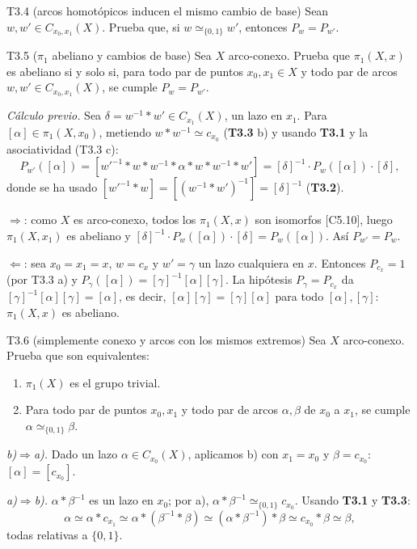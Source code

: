 \begin{ejercicio}{T3.4 (arcos homotópicos inducen el mismo cambio de base)}
Sean $w, w' \in C_{x_0,x_1}(X)$. Prueba que, si $w \simeq_{\{0,1\}} w'$, entonces $P_w = P_{w'}$.

\end{ejercicio}

\begin{ejercicio}{T3.5 ($\pi_1$ abeliano y cambios de base)}
Sea $X$ arco-conexo. Prueba que $\pi_1(X,x)$ es abeliano si y solo si, para todo par de puntos $x_0, x_1 \in X$ y todo par de arcos $w, w' \in C_{x_0,x_1}(X)$, se cumple $P_w = P_{w'}$.

\sol \fuentepropia

\emph{Cálculo previo.} Sea $\delta = w^{-1} * w' \in C_{x_1}(X)$, un lazo en $x_1$. Para $[\alpha] \in \pi_1(X,x_0)$, metiendo $w * w^{-1} \simeq c_{x_0}$ (\textbf{T3.3} b) y usando \textbf{T3.1} y la asociatividad (T3.3 c):
\[ P_{w'}([\alpha]) = [w'^{-1} * w * w^{-1} * \alpha * w * w^{-1} * w'] = [\delta]^{-1} \cdot P_w([\alpha]) \cdot [\delta], \]
donde se ha usado $[w'^{-1} * w] = [(w^{-1} * w')^{-1}] = [\delta]^{-1}$ (\textbf{T3.2}).

$\Rightarrow$: como $X$ es arco-conexo, todos los $\pi_1(X,x)$ son isomorfos [C5.10], luego $\pi_1(X,x_1)$ es abeliano y $[\delta]^{-1} \cdot P_w([\alpha]) \cdot [\delta] = P_w([\alpha])$. Así $P_{w'} = P_w$.

$\Leftarrow$: sea $x_0 = x_1 = x$, $w = c_x$ y $w' = \gamma$ un lazo cualquiera en $x$. Entonces $P_{c_x} = 1$ (por T3.3 a) y $P_\gamma([\alpha]) = [\gamma]^{-1}[\alpha][\gamma]$. La hipótesis $P_\gamma = P_{c_x}$ da $[\gamma]^{-1}[\alpha][\gamma] = [\alpha]$, es decir, $[\alpha][\gamma] = [\gamma][\alpha]$ para todo $[\alpha], [\gamma]$: $\pi_1(X,x)$ es abeliano.
\end{ejercicio}

\begin{ejercicio}{T3.6 (simplemente conexo y arcos con los mismos extremos)}
Sea $X$ arco-conexo. Prueba que son equivalentes:
\begin{enumerate}
    \item[a)] $\pi_1(X)$ es el grupo trivial.
    \item[b)] Para todo par de puntos $x_0, x_1$ y todo par de arcos $\alpha, \beta$ de $x_0$ a $x_1$, se cumple $\alpha \simeq_{\{0,1\}} \beta$.
\end{enumerate}

\sol \fuentepropia

\emph{b)$\Rightarrow$a).} Dado un lazo $\alpha \in C_{x_0}(X)$, aplicamos b) con $x_1 = x_0$ y $\beta = c_{x_0}$: $[\alpha] = [c_{x_0}]$.

\emph{a)$\Rightarrow$b).} $\alpha * \beta^{-1}$ es un lazo en $x_0$; por a), $\alpha * \beta^{-1} \simeq_{\{0,1\}} c_{x_0}$. Usando \textbf{T3.1} y \textbf{T3.3}:
\[ \alpha \simeq \alpha * c_{x_1} \simeq \alpha * (\beta^{-1} * \beta) \simeq (\alpha * \beta^{-1}) * \beta \simeq c_{x_0} * \beta \simeq \beta, \]
todas relativas a $\{0,1\}$.
\end{ejercicio}


